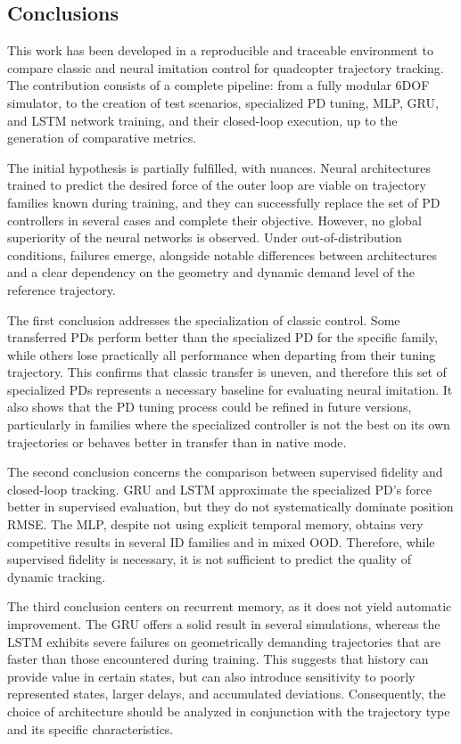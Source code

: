 \subsection{Conclusions}

This work has been developed in a reproducible and traceable environment to compare classic and neural imitation control for quadcopter trajectory tracking. The contribution consists of a complete pipeline: from a fully modular 6DOF simulator, to the creation of test scenarios, specialized PD tuning, MLP, GRU, and LSTM network training, and their closed-loop execution, up to the generation of comparative metrics.

The initial hypothesis is partially fulfilled, with nuances. Neural architectures trained to predict the desired force of the outer loop are viable on trajectory families known during training, and they can successfully replace the set of PD controllers in several cases and complete their objective. However, no global superiority of the neural networks is observed. Under out-of-distribution conditions, failures emerge, alongside notable differences between architectures and a clear dependency on the geometry and dynamic demand level of the reference trajectory.

The first conclusion addresses the specialization of classic control. Some transferred PDs perform better than the specialized PD for the specific family, while others lose practically all performance when departing from their tuning trajectory. This confirms that classic transfer is uneven, and therefore this set of specialized PDs represents a necessary baseline for evaluating neural imitation. It also shows that the PD tuning process could be refined in future versions, particularly in families where the specialized controller is not the best on its own trajectories or behaves better in transfer than in native mode.

The second conclusion concerns the comparison between supervised fidelity and closed-loop tracking. GRU and LSTM approximate the specialized PD's force better in supervised evaluation, but they do not systematically dominate position RMSE. The MLP, despite not using explicit temporal memory, obtains very competitive results in several ID families and in mixed OOD. Therefore, while supervised fidelity is necessary, it is not sufficient to predict the quality of dynamic tracking.

The third conclusion centers on recurrent memory, as it does not yield automatic improvement. The GRU offers a solid result in several simulations, whereas the LSTM exhibits severe failures on geometrically demanding trajectories that are faster than those encountered during training. This suggests that history can provide value in certain states, but can also introduce sensitivity to poorly represented states, larger delays, and accumulated deviations. Consequently, the choice of architecture should be analyzed in conjunction with the trajectory type and its specific characteristics.

